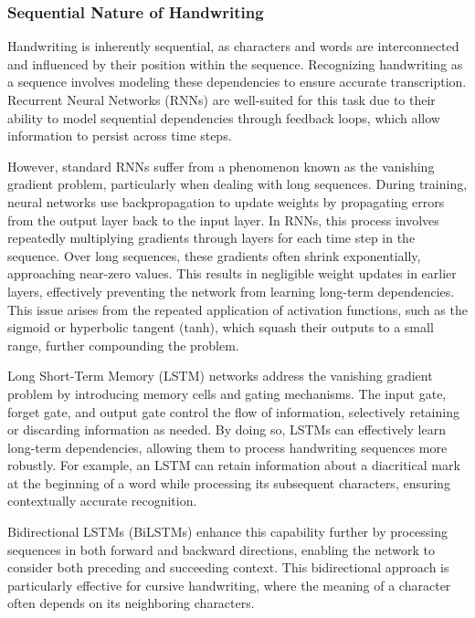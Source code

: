 \documentclass[conference]{IEEEtran}
\begin{document}
\subsubsection{Sequential Nature of Handwriting}

Handwriting is inherently sequential, as characters and words are interconnected and influenced by their position within the sequence. Recognizing handwriting as a sequence involves modeling these dependencies to ensure accurate transcription. Recurrent Neural Networks (RNNs) are well-suited for this task due to their ability to model sequential dependencies through feedback loops, which allow information to persist across time steps. 


However, standard RNNs suffer from a phenomenon known as the vanishing gradient problem, particularly when dealing with long sequences. During training, neural networks use backpropagation to update weights by propagating errors from the output layer back to the input layer. In RNNs, this process involves repeatedly multiplying gradients through layers for each time step in the sequence. Over long sequences, these gradients often shrink exponentially, approaching near-zero values. This results in negligible weight updates in earlier layers, effectively preventing the network from learning long-term dependencies. This issue arises from the repeated application of activation functions, such as the sigmoid or hyperbolic tangent (tanh), which squash their outputs to a small range, further compounding the problem.

Long Short-Term Memory (LSTM) networks address the vanishing gradient problem by introducing memory cells and gating mechanisms. The input gate, forget gate, and output gate control the flow of information, selectively retaining or discarding information as needed. By doing so, LSTMs can effectively learn long-term dependencies, allowing them to process handwriting sequences more robustly. For example, an LSTM can retain information about a diacritical mark at the beginning of a word while processing its subsequent characters, ensuring contextually accurate recognition.

Bidirectional LSTMs (BiLSTMs) enhance this capability further by processing sequences in both forward and backward directions, enabling the network to consider both preceding and succeeding context. This bidirectional approach is particularly effective for cursive handwriting, where the meaning of a character often depends on its neighboring characters.
\end{document}
